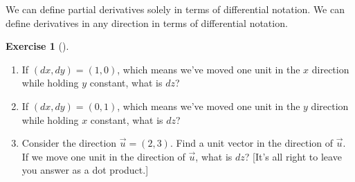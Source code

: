 \documentclass[10pt,]{book}
\theoremstyle{plain}
\theoremstyle{definition}
\theoremstyle{definition}
\theoremstyle{definition}
\theoremstyle{definition}
\newtheorem{exploration}[project]{Exercise}
\theoremstyle{definition}
\numberwithin{equation}{section}
\begin{document}
We can define partial derivatives solely in terms of differential notation. We can define derivatives in any direction in terms of differential notation.%
\begin{exploration}[]\label{exploration-227}
\leavevmode%
\begin{enumerate}[font=\bfseries,label=(\alph*),ref=\alph*]
\item\label{task-602} If \((dx,dy)=(1,0)\), which means we've moved one unit in the \(x\) direction while holding \(y\) constant, what is \(dz\)?%
\item\label{task-603} If \((dx,dy)=(0,1)\), which means we've moved one unit in the \(y\) direction while holding \(x\) constant, what is \(dz\)?%
\item\label{task-604} Consider the direction \(\vec u=(2,3)\).  Find a unit vector in the direction of \(\vec u\).  If we move one unit in the direction of \(\vec u\), what is \(dz\)? [It's all right to leave you answer as a dot product.]%
\end{enumerate}
\end{exploration}
\typeout{************************************************}
\typeout{************************************************}
\end{document}
